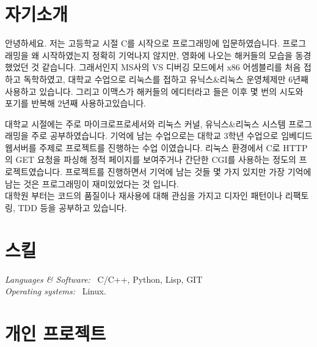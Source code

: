 \documentclass[line,margin]{res}
\begin{document}
\address{E-mail: vmfhrmfoaj@yahoo.com}


\begin{resume}

  \section{자기소개}

  안녕하세요.
  저는 고등학교 시절 C를 시작으로 프로그래밍에 입문하였습니다.
  프로그래밍을 왜 시작하였는지 정확히 기억나지 않지만, 영화에 나오는 해커들의 모습을 동경했었던 것 같습니다.
  그래서인지 MS사의 VS 디버깅 모드에서 x86 어셈블리를 처음 접하고 독학하였고,
  대학교 수업으로 리눅스를 접하고 유닉스\&리눅스 운영체제만 6년째 사용하고 있습니다.
  그리고 이맥스가 해커들의 에디터라고 들은 이후 몇 번의 시도와 포기를 반복해 2년째 사용하고있습니다.
  \vspace{-1mm}

  대학교 시절에는 주로 마이크로프로세서와 리눅스 커널, 유닉스\&리눅스 시스템 프로그래밍을 주로 공부하였습니다.
  기억에 남는 수업으로는 대학교 3학년 수업으로 임베디드 웹서버를 주제로 프로젝트를 진행하는 수업 이였습니다.
  리눅스 환경에서 C로 HTTP의 GET 요청을 파싱해 정적 페이지를 보여주거나 간단한 CGI를 사용하는 정도의 프로젝트였습니다.
  프로젝트를 진행하면서 기억에 남는 것들 몇 가지 있지만 가장 기억에 남는 것은 프로그래밍이 재미있었다는 것 입니다. \\
  대학원 부터는 코드의 품질이나 재사용에 대해 관심을 가지고 디자인 패턴이나 리팩토링, TDD 등을 공부하고 있습니다.


  \section{스킬}

  {\sl Languages \& Software:} ~C/C++, Python, Lisp, GIT \\
  {\sl Operating systems:} ~Linux.


  \section{개인 프로젝트}


\end{resume}
\end{document}
